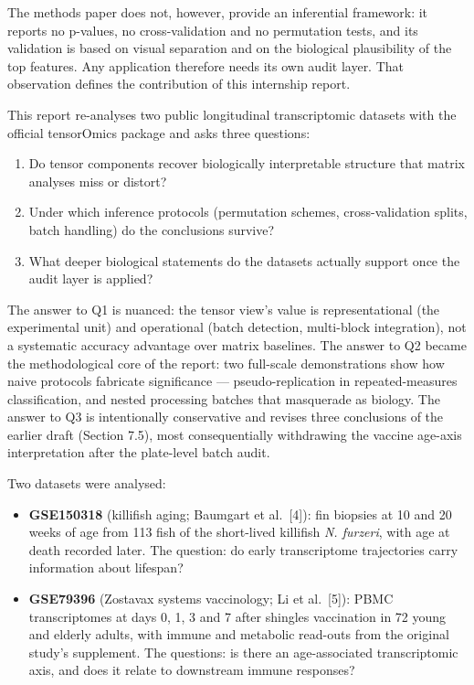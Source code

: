 \documentclass[
]{article}
\providecommand{\tightlist}{%
  \setlength{\itemsep}{0pt}\setlength{\parskip}{0pt}}
\begin{document}
The methods paper does not, however, provide an inferential framework:
it reports no p-values, no cross-validation and no permutation tests,
and its validation is based on visual separation and on the biological
plausibility of the top features. Any application therefore needs its
own audit layer. That observation defines the contribution of this
internship report.

This report re-analyses two public longitudinal transcriptomic datasets
with the official tensorOmics package and asks three questions:

\begin{enumerate}
\def\labelenumi{\arabic{enumi}.}
\tightlist
\item
  Do tensor components recover biologically interpretable structure that
  matrix analyses miss or distort?
\item
  Under which inference protocols (permutation schemes, cross-validation
  splits, batch handling) do the conclusions survive?
\item
  What deeper biological statements do the datasets actually support
  once the audit layer is applied?
\end{enumerate}

The answer to Q1 is nuanced: the tensor view's value is representational
(the experimental unit) and operational (batch detection, multi-block
integration), not a systematic accuracy advantage over matrix baselines.
The answer to Q2 became the methodological core of the report: two
full-scale demonstrations show how naive protocols fabricate
significance --- pseudo-replication in repeated-measures classification,
and nested processing batches that masquerade as biology. The answer to
Q3 is intentionally conservative and revises three conclusions of the
earlier draft (Section 7.5), most consequentially withdrawing the
vaccine age-axis interpretation after the plate-level batch audit.

Two datasets were analysed:

\begin{itemize}
\tightlist
\item
  \textbf{GSE150318} (killifish aging; Baumgart et al.~{[}4{]}): fin
  biopsies at 10 and 20 weeks of age from 113 fish of the short-lived
  killifish \emph{N. furzeri}, with age at death recorded later. The
  question: do early transcriptome trajectories carry information about
  lifespan?
\item
  \textbf{GSE79396} (Zostavax systems vaccinology; Li et al.~{[}5{]}):
  PBMC transcriptomes at days 0, 1, 3 and 7 after shingles vaccination
  in 72 young and elderly adults, with immune and metabolic read-outs
  from the original study's supplement. The questions: is there an
  age-associated transcriptomic axis, and does it relate to downstream
  immune responses?
\end{itemize}
\end{document}

